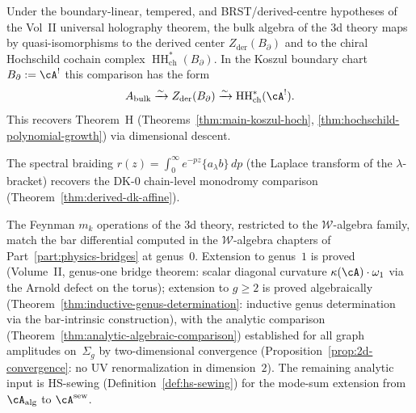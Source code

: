 \begin{conjecture}
\label{conj:vol2-hochschild-bridge}
Under the boundary-linear, tempered, and BRST/derived-centre
hypotheses of the Vol~II universal holography theorem, the bulk algebra
of the 3d theory maps by quasi-isomorphisms to the derived center
$Z_{\mathrm{der}}(B_\partial)$ and to the chiral Hochschild cochain
complex $\operatorname{HH}^*_{\mathrm{ch}}(B_\partial)$. In the Koszul
boundary chart $B_\partial:=\cA^!$ this comparison has the form
\[
A_{\mathrm{bulk}}
\xrightarrow{\sim}
Z_{\mathrm{der}}(B_\partial)
\xrightarrow{\sim}
\operatorname{HH}^*_{\mathrm{ch}}(\cA^!).
\]
This recovers Theorem~H
(Theorems~\ref{thm:main-koszul-hoch},
\ref{thm:hochschild-polynomial-growth}) via dimensional
descent.
\end{conjecture}

\begin{proposition}
\label{prop:vol2-dk-ybe-bridge}%
The spectral braiding $r(z) = \int_0^\infty e^{-pz}
\{a_\lambda b\}\,dp$ (the Laplace transform of the
$\lambda$-bracket) recovers the DK-0 chain-level
monodromy comparison (Theorem~\ref{thm:derived-dk-affine}).
\end{proposition}

\begin{proposition}
\label{prop:vol2-w-algebra-bridge}%
The Feynman $m_k$ operations of the 3d theory, restricted to
the $\mathcal{W}$-algebra family, match the bar differential computed in the
$\mathcal{W}$-algebra chapters of Part~\ref{part:physics-bridges} at genus~$0$.
Extension to genus~$1$ is proved
(Volume~II, genus-one bridge theorem:
scalar diagonal curvature $\kappa(\cA)\cdot\omega_1$ via the Arnold
defect on the torus); extension to $g \geq 2$ is proved algebraically
(Theorem~\ref{thm:inductive-genus-determination}:
inductive genus determination via the bar-intrinsic construction),
with the analytic comparison
(Theorem~\ref{thm:analytic-algebraic-comparison})
established for all graph amplitudes on~$\Sigma_g$
by two-dimensional convergence
(Proposition~\ref{prop:2d-convergence}:
no UV renormalization in dimension~$2$).
The remaining analytic input is HS-sewing
(Definition~\ref{def:hs-sewing}) for the mode-sum
extension from $\cA_{\mathrm{alg}}$ to $\cA^{\mathrm{sew}}$.
\end{proposition}

